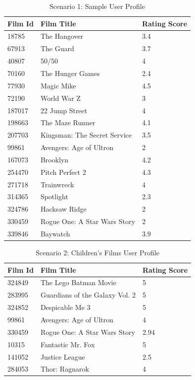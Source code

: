 \begin{table}[H]
    \centering
    \begin{tabular}{p{} p{} p{}}
    \hline
    \textbf{Film Id} & \textbf{Film Title} & \textbf{Rating Score} \\ \hline
    18785 & The Hangover & 3.4 \\
    67913 & The Guard & 3.7 \\
    40807 & 50/50 & 4 \\
    70160 & The Hunger Games & 2.4 \\
    77930 & Magic Mike & 4.5 \\
    72190 & World War Z & 3 \\
    187017 & 22 Jump Street & 4 \\
    198663 & The Maze Runner & 4.1 \\
    207703 & Kingsman: The Secret Service & 3.5 \\
    99861 & Avengers: Age of Ultron & 2 \\
    167073 & Brooklyn & 4.2 \\
    254470 & Pitch Perfect 2 & 4.3 \\
    271718 & Trainwreck & 4 \\
    314365 & Spotlight & 2.3 \\
    324786 & Hacksaw Ridge & 2 \\
    330459 & Rogue One: A Star Wars Story & 2 \\
    339846 & Baywatch & 3.9 \\ \hline
    \end{tabular}
    \caption{Scenario 1: Sample User Profile}
    \label{tab:scenario1_user_profile}
    
    \end{table}


    \begin{table}[H]
        \centering
        \begin{tabular}{p{} p{} p{}}
        \hline
        \textbf{Film Id} & \textbf{Film Title} & \textbf{Rating Score} \\ \hline
        324849 & The Lego Batman Movie & 5 \\
        283995 & Guardians of the Galaxy Vol. 2 & 5 \\
        324852 & Despicable Me 3 & 5 \\
        99861 & Avengers: Age of Ultron & 4 \\
        330459 & Rogue One: A Star Wars Story & 2.94 \\
        10315 & Fantastic Mr. Fox & 5 \\
        141052 & Justice League & 2.5 \\
        284053 & Thor: Ragnarok & 4 \\ \hline
        \end{tabular}
        \caption{Scenario 2: Children's Films User Profile}
        \label{tab:scenario2_user_profile}
    \end{table}



